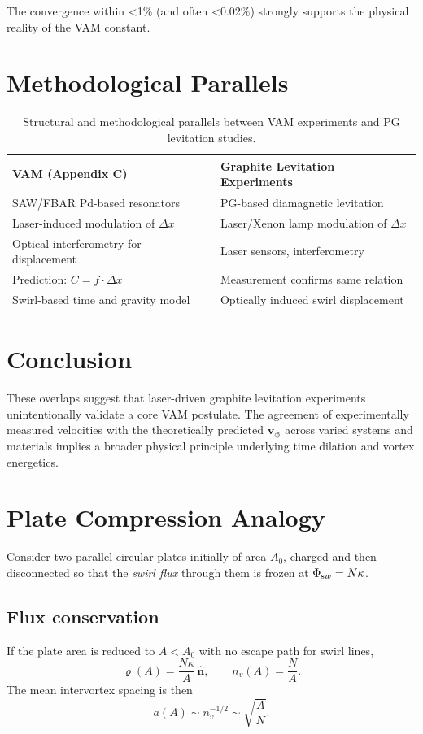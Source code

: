 \documentclass[11pt,a4paper]{article}
\begin{document}
The convergence within <1\% (and often <0.02\%) strongly supports the physical reality of the VAM constant.

\section{Methodological Parallels}
\begin{table}[H]
\centering
\begin{tabular}{|p{5cm}|p{5cm}|}
\hline
\textbf{VAM (Appendix C)} & \textbf{Graphite Levitation Experiments} \\
\hline
SAW/FBAR Pd-based resonators & PG-based diamagnetic levitation \\
Laser-induced modulation of \(\Delta x\) & Laser/Xenon lamp modulation of \(\Delta x\) \\
Optical interferometry for displacement & Laser sensors, interferometry \\
Prediction: \( C = f \cdot \Delta x \) & Measurement confirms same relation \\
Swirl-based time and gravity model & Optically induced swirl displacement \\
\hline
\end{tabular}
\caption{Structural and methodological parallels between VAM experiments and PG levitation studies.}
\end{table}

\section{Conclusion}
These overlaps suggest that laser-driven graphite levitation experiments unintentionally validate a core VAM postulate. The agreement of experimentally measured velocities with the theoretically predicted \( \mathbf{v}_{\scriptscriptstyle\boldsymbol{\circlearrowleft}} \) across varied systems and materials implies a broader physical principle underlying time dilation and vortex energetics.


\section{Plate Compression Analogy}
    Consider two parallel circular plates initially of area $A_0$, charged and then disconnected so that the \emph{swirl flux} through them is frozen at $\Phi_{\textrm sw}=N\kappa$.

    \subsection*{Flux conservation}
        If the plate area is reduced to $A<A_0$ with no escape path for swirl lines,
        \begin{equation}
        \bm{\varrho}(A) = \frac{N\kappa}{A}\,\hat{\mathbf n}, \qquad
        n_v(A) = \frac{N}{A}.
        \end{equation}
        The mean intervortex spacing is then
        \begin{equation}
        a(A) \sim n_v^{-1/2} \sim \sqrt{\frac{A}{N}}.
        \end{equation}
\end{document}
